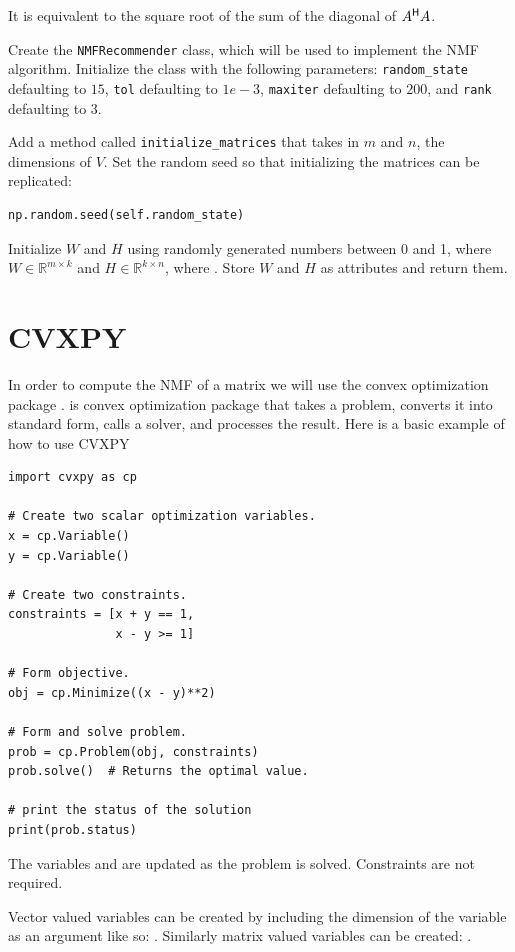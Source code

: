 It is equivalent to the square root of the sum of the diagonal of $A^{\mathsf H} A$.



\begin{problem}
Create the \texttt{NMFRecommender} class, which will be used to implement the NMF algorithm.
Initialize the class with the following parameters: 
\texttt{random\_state} defaulting to $15$,
\texttt{tol} defaulting to $1e-3$, \texttt{maxiter} defaulting to $200$, and \texttt{rank} defaulting to $3$.


Add a method called \texttt{initialize\_matrices} that takes in $m$ and $n$, the dimensions of $V$.
Set the random seed so that initializing the matrices can be replicated:
\begin{lstlisting}
np.random.seed(self.random_state)
\end{lstlisting}
Initialize $W$ and $H$ using randomly generated numbers between 0 and 1, where $W\in\mathbb{R}^{m\times k}$ and $H\in\mathbb{R}^{k\times n}$, where .
Store $W$ and $H$ as attributes and return them.
\end{problem}

\section*{CVXPY}
In order to compute the NMF of a matrix we will use the convex optimization package .
 is convex optimization package that takes a problem, converts it into standard form, calls a solver, and processes the result.
Here is a basic example of how to use CVXPY
\begin{lstlisting}
import cvxpy as cp

# Create two scalar optimization variables.
x = cp.Variable()
y = cp.Variable()

# Create two constraints.
constraints = [x + y == 1,
               x - y >= 1]

# Form objective.
obj = cp.Minimize((x - y)**2)

# Form and solve problem.
prob = cp.Problem(obj, constraints)
prob.solve()  # Returns the optimal value.

# print the status of the solution
print(prob.status)
\end{lstlisting}
The variables  and  are updated as the problem is solved.
Constraints are not required.

Vector valued variables can be created by including the dimension of the variable as an argument like so: .
Similarly matrix valued variables can be created: .

